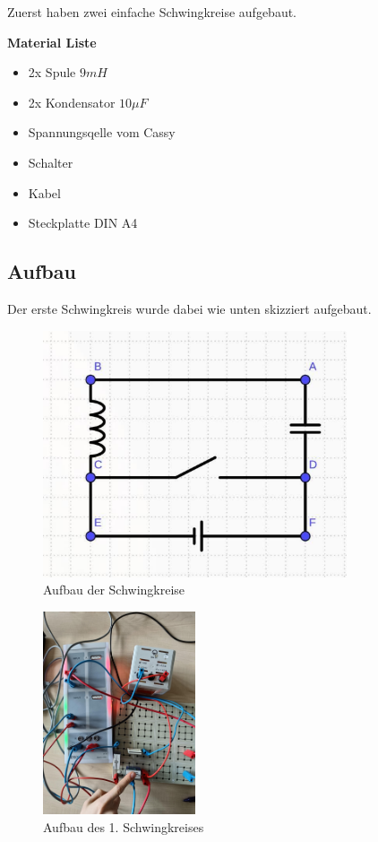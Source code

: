 \documentclass[twoside]{protokoll}
\begin{document}
Zuerst haben zwei einfache Schwingkreise aufgebaut.
 
\textbf{Material Liste}
\begin{itemize}
  \item 2x Spule $9mH$
  \item 2x Kondensator $10 \mu F$
  \item Spannungsqelle vom Cassy
  \item Schalter
  \item Kabel
  \item Steckplatte DIN A4
\end{itemize}

\subsection{Aufbau}
Der erste Schwingkreis wurde dabei wie unten skizziert aufgebaut.
\begin{figure}[H]
    \centering
    \includegraphics[width=0.8\textwidth]{schaltplan-einzelschwingkreis.pdf}
    \caption{Aufbau der Schwingkreise}
\end{figure}
\begin{figure}[H]
    \centering
    \includegraphics[width=0.4\textwidth]{bilder/schwingkreis1.pdf}
    \caption{Aufbau des 1. Schwingkreises}
\end{figure}
   
\end{document}
